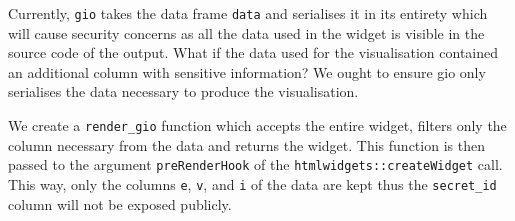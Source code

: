 \documentclass[
  10pt,
]{krantz}
\makeatletter
\newenvironment{Shaded}{\begin{snugshade}}{\end{snugshade}}
\newcommand{\CommentTok}[1]{\textcolor[rgb]{0.37,0.37,0.37}{\textit{#1}}}
\newcommand{\ControlFlowTok}[1]{\textcolor[rgb]{0.27,0.27,0.27}{\textbf{#1}}}
\newcommand{\DataTypeTok}[1]{\textcolor[rgb]{0.27,0.27,0.27}{#1}}
\newcommand{\DecValTok}[1]{\textcolor[rgb]{0.06,0.06,0.06}{#1}}
\newcommand{\KeywordTok}[1]{\textcolor[rgb]{0.27,0.27,0.27}{\textbf{#1}}}
\newcommand{\NormalTok}[1]{#1}
\newcommand{\OperatorTok}[1]{\textcolor[rgb]{0.43,0.43,0.43}{\textbf{#1}}}
\newcommand{\OtherTok}[1]{\textcolor[rgb]{0.37,0.37,0.37}{#1}}
\newcommand{\StringTok}[1]{\textcolor[rgb]{0.5,0.5,0.5}{#1}}
\newenvironment{kframe}{%
\medskip{}
\setlength{\fboxsep}{.8em}
 \def\at@end@of@kframe{}%
 \ifinner\ifhmode%
  \def\at@end@of@kframe{\end{minipage}}%
  \begin{minipage}{\columnwidth}%
 \fi\fi%
 \def\FrameCommand##1{\hskip\@totalleftmargin \hskip-\fboxsep
 \colorbox{shadecolor}{##1}\hskip-\fboxsep
     \hskip-\linewidth \hskip-\@totalleftmargin \hskip\columnwidth}%
 \MakeFramed {\advance\hsize-\width
   \@totalleftmargin\z@ \linewidth\hsize
   \@setminipage}}%
 {\par\unskip\endMakeFramed%
 \at@end@of@kframe}
\renewenvironment{Shaded}{\begin{kframe}}{\end{kframe}}
\makeatother
\begin{document}
Currently, \texttt{gio} takes the data frame \texttt{data} and serialises it in its entirety which will cause security concerns as all the data used in the widget is visible in the source code of the output. What if the data used for the visualisation contained an additional column with sensitive information? We ought to ensure gio only serialises the data necessary to produce the visualisation.

\begin{Shaded}
\end{Shaded}

We create a \texttt{render\_gio} function which accepts the entire widget, filters only the column necessary from the data and returns the widget. This function is then passed to the argument \texttt{preRenderHook} of the \texttt{htmlwidgets::createWidget} call. This way, only the columns \texttt{e}, \texttt{v}, and \texttt{i} of the data are kept thus the \texttt{secret\_id} column will not be exposed publicly.

\begin{Shaded}
\end{Shaded}
\end{document}
